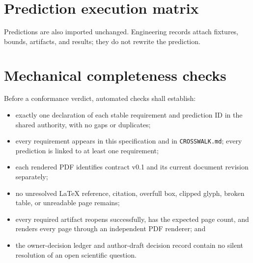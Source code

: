 \documentclass[10pt]{article}
\newcommand{\MaybeRequirementBreak}[1]{%
  \ifcsname SCIMapRequirementBreak#1\endcsname
    \csname SCIMapRequirementBreak#1\endcsname
  \fi}
\newcommand{\MaybePredictionBreak}[1]{%
  \ifcsname SCIMapPredictionBreak#1\endcsname
    \csname SCIMapPredictionBreak#1\endcsname
  \fi}
\begin{document}
\renewcommand{\SCIMapRequirement}[4]{%
  \MaybeRequirementBreak{#1}%
  \phantomsection\label{engreq:#1}%
  \noindent\textbf{\textcolor{EngNavy}{#1} -- #2}\par
  \textbf{Canonical clause:} #3\par
  \textbf{Minimum conformance evidence:} #4\par
  \textbf{Result:} \textcolor{EngGray}{UNASSESSED}\par
  \smallskip\hrule\smallskip}
\begin{sloppypar}\small
\SCIMapRequirements
\end{sloppypar}\normalsize

\clearpage
\section{Prediction execution matrix}\label{sec:predictions}

Predictions are also imported unchanged. Engineering records attach fixtures,
bounds, artifacts, and results; they do not rewrite the prediction.

\renewcommand{\SCIMapPrediction}[4]{%
  \MaybePredictionBreak{#1}%
  \phantomsection\label{engpred:#1}%
  \noindent\textbf{\textcolor{EngNavy}{#1} -- #2}\par
  \textbf{Canonical prediction:} #3\par
  \textbf{Primary claim layer:} #4.\par
  \textbf{Fixture / bound / result:} \textcolor{EngGray}{TO BE PREREGISTERED}\par
  \smallskip\hrule\smallskip}
\SCIMapPredictions

\clearpage
\section{Mechanical completeness checks}

Before a conformance verdict, automated checks shall establish:

\begin{itemize}
\item exactly one declaration of each stable requirement and prediction ID in
the shared authority, with no gaps or duplicates;
\item every requirement appears in this specification and in
\texttt{CROSSWALK.md}; every prediction is linked to at least one requirement;
\item each rendered PDF identifies contract v0.1 and its current document
revision separately;
\item no unresolved LaTeX reference, citation, overfull box, clipped glyph,
broken table, or unreadable page remains;
\item every required artifact reopens successfully, has the expected page
count, and renders every page through an independent PDF renderer; and
\item the owner-decision ledger and author-draft decision record contain no
silent resolution of an open scientific question.
\end{itemize}
\end{document}
